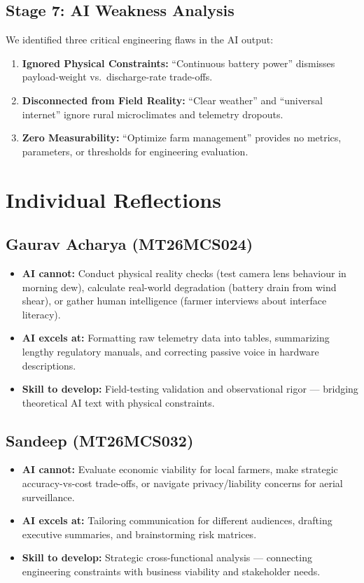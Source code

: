 \documentclass[11pt, a4paper]{article}
\begin{document}
\subsection{Stage 7: AI Weakness Analysis}
We identified three critical engineering flaws in the AI output:
\begin{enumerate}[nosep]
    \item \textbf{Ignored Physical Constraints:} ``Continuous battery power'' dismisses payload-weight vs.\ discharge-rate trade-offs.
    \item \textbf{Disconnected from Field Reality:} ``Clear weather'' and ``universal internet'' ignore rural microclimates and telemetry dropouts.
    \item \textbf{Zero Measurability:} ``Optimize farm management'' provides no metrics, parameters, or thresholds for engineering evaluation.
\end{enumerate}

\section{Individual Reflections}

\subsection{Gaurav Acharya (MT26MCS024)}
\begin{itemize}[nosep]
    \item \textbf{AI cannot:} Conduct physical reality checks (test camera lens behaviour in morning dew), calculate real-world degradation (battery drain from wind shear), or gather human intelligence (farmer interviews about interface literacy).
    \item \textbf{AI excels at:} Formatting raw telemetry data into tables, summarizing lengthy regulatory manuals, and correcting passive voice in hardware descriptions.
    \item \textbf{Skill to develop:} Field-testing validation and observational rigor --- bridging theoretical AI text with physical constraints.
\end{itemize}

\subsection{Sandeep (MT26MCS032)}
\begin{itemize}[nosep]
    \item \textbf{AI cannot:} Evaluate economic viability for local farmers, make strategic accuracy-vs-cost trade-offs, or navigate privacy/liability concerns for aerial surveillance.
    \item \textbf{AI excels at:} Tailoring communication for different audiences, drafting executive summaries, and brainstorming risk matrices.
    \item \textbf{Skill to develop:} Strategic cross-functional analysis --- connecting engineering constraints with business viability and stakeholder needs.
\end{itemize}
\end{document}
